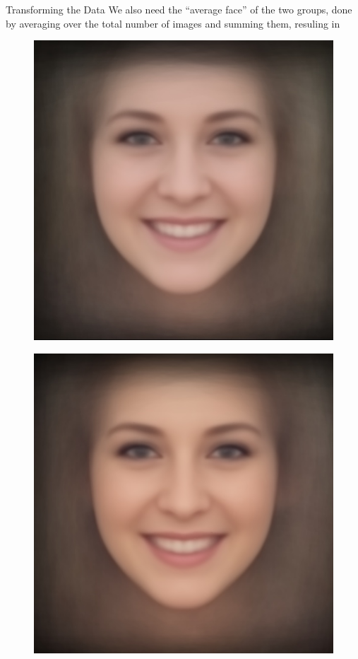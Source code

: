 \documentclass[final]{beamer}
\newlength{\onecolwid}
\begin{document}
\begin{frame}[t]
\begin{columns}[t]
\begin{column}{\onecolwid}
\begin{block}{Transforming the Data}
We also need the ``average face'' of the two groups, done by averaging over the total number of images and summing them, resuling in

\begin{figure}
\centering
\begin{minipage}{.5\textwidth}
  \centering
  \includegraphics[width=.85\linewidth]{../data/Provo_avg.jpg}
  \label{fig:mo}
\end{minipage}%
\begin{minipage}{.5\textwidth}
  \centering
  \includegraphics[width=.85\linewidth]{../data/Seattle_avg.jpg}
  \label{fig:non_mo}
\end{minipage}
\end{figure}


\end{block}
\end{column}
\end{columns}
\end{frame}
\end{document}
